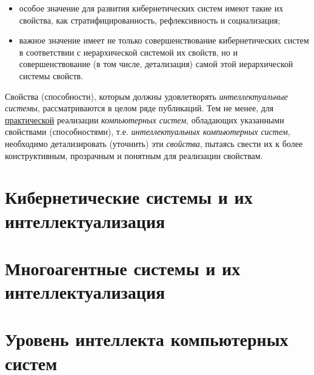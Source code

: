 {\begin{itemize}
		\item особое значение для развития кибернетических систем имеют такие их свойства, как стратифицированность, рефлексивность и социализация;
		\item важное значение имеет не только совершенствование кибернетических систем в соответствии с иерархической системой их свойств, но и совершенствование (в том числе, детализация) самой этой иерархической системы свойств.
	\end{itemize}
	Свойства (способности), которым должны удовлетворять \textit{интеллектуальные системы}, рассматриваются в целом ряде публикаций. 
	Тем не менее, для \uline{практической} реализации \textit{компьютерных систем}, обладающих указанными свойствами (способностями), т.е. \textit{интеллектуальных компьютерных систем}, необходимо детализировать (уточнить) эти \textit{свойства}, пытаясь свести их к более конструктивным, прозрачным и понятным для реализации свойствам.
}

\section{Кибернетические системы и их интеллектуализация}




\section{Многоагентные системы и их интеллектуализация} 
{\label{section_mas}} 

\section{Уровень интеллекта компьютерных систем}

%